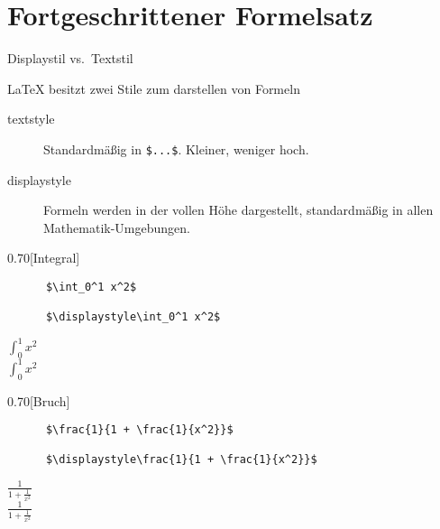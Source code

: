 \section{Fortgeschrittener Formelsatz}

\begin{frame}[fragile]{Displaystil vs.\ Textstil}

  \LaTeX{} besitzt zwei Stile zum darstellen von Formeln
  \begin{description}
    \item[textstyle] Standardmäßig in \lstinline+$...$+. Kleiner, weniger hoch.
    \item[displaystyle] Formeln werden in der vollen Höhe dargestellt, standardmäßig in allen Mathematik-Umgebungen.
  \end{description}

  \begin{CodeExample}{0.70}[Integral]
    \begin{lstlisting}
      $\int_0^1 x^2$

      $\displaystyle\int_0^1 x^2$
    \end{lstlisting}
  \CodeResult
    \strut
    $\int_0^1 x^2$ \\[0.5\baselineskip]
    $\displaystyle\int_0^1 x^2$
  \end{CodeExample}

  \begin{CodeExample}{0.70}[Bruch]
    \begin{lstlisting}
      $\frac{1}{1 + \frac{1}{x^2}}$

      $\displaystyle\frac{1}{1 + \frac{1}{x^2}}$
    \end{lstlisting}
  \CodeResult
    $\frac{1}{1 + \frac{1}{x^2}}$\\[0.5\baselineskip]
    $\displaystyle\frac{1}{1 + \frac{1}{x^2}}$
  \end{CodeExample}
\end{frame}

